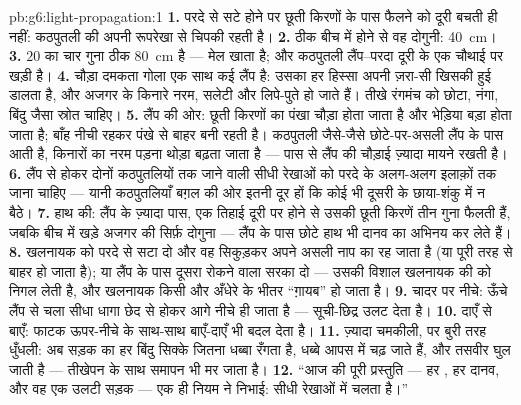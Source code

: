 \begin{solution}{pb:g6:light-propagation:1}
\textbf{1.} परदे से सटे होने पर छूती किरणों के पास फैलने को दूरी बचती
ही नहीं:  कठपुतली की अपनी रूपरेखा से चिपकी रहती है।
\textbf{2.} ठीक बीच में होने से वह दोगुनी: \qty{40}{cm}।
\textbf{3.} $20$ का चार गुना ठीक \qty{80}{cm} है --- मेल खाता है;
और कठपुतली लैंप--परदा दूरी के एक चौथाई पर खड़ी है।
\textbf{4.} चौड़ा दमकता गोला एक साथ कई लैंप है: उसका हर हिस्सा अपनी
ज़रा-सी खिसकी हुई  डालता है, और अजगर के किनारे नरम, सलेटी और
लिपे-पुते हो जाते हैं। तीखे रंगमंच को छोटा, नंगा, बिंदु जैसा स्रोत
चाहिए।
\textbf{5.} लैंप की ओर: छूती किरणों का पंखा चौड़ा होता जाता है और
भेड़िया बड़ा होता जाता है; बाँह नीची रहकर पंखे से बाहर बनी रहती है।
कठपुतली जैसे-जैसे छोटे-पर-असली लैंप के पास आती है, किनारों का नरम पड़ना
थोड़ा बढ़ता जाता है --- पास से लैंप की चौड़ाई ज़्यादा मायने रखती है।
\textbf{6.} लैंप से होकर दोनों कठपुतलियों तक जाने वाली सीधी रेखाओं को
परदे के अलग-अलग इलाक़ों तक जाना चाहिए --- यानी कठपुतलियाँ बग़ल की ओर
इतनी दूर हों कि कोई भी दूसरी के छाया-शंकु में न बैठे।
\textbf{7.} हाथ की: लैंप के ज़्यादा पास, एक तिहाई दूरी पर होने से
उसकी छूती किरणें तीन गुना फैलती हैं, जबकि बीच में खड़े अजगर की सिर्फ़
दोगुना --- लैंप के पास छोटे हाथ भी दानव का अभिनय कर लेते हैं।
\textbf{8.} खलनायक को परदे से सटा दो और वह सिकुड़कर अपने असली नाप का
रह जाता है (या पूरी तरह  से बाहर हो जाता है); या लैंप के पास
दूसरा रोकने वाला सरका दो --- उसकी विशाल  खलनायक की  को निगल
लेती है, और खलनायक किसी और अँधेरे के भीतर ``ग़ायब'' हो जाता है।
\textbf{9.} चादर पर नीचे: ऊँचे लैंप से चला सीधा धागा छेद से होकर आगे
नीचे ही जाता है --- सूची-छिद्र उलट देता है।
\textbf{10.} दाएँ से बाएँ: फाटक ऊपर-नीचे के साथ-साथ बाएँ-दाएँ भी बदल
देता है।
\textbf{11.} ज़्यादा चमकीली, पर बुरी तरह धुँधली: अब सड़क का हर बिंदु
सिक्के जितना धब्बा रँगता है, धब्बे आपस में चढ़ जाते हैं, और तसवीर घुल
जाती है --- तीखेपन के साथ समापन भी मर जाता है।
\textbf{12.} ``आज की पूरी प्रस्तुति --- हर , हर दानव, और वह एक
उलटी सड़क --- एक ही नियम ने निभाई:  सीधी रेखाओं में चलता है।''
\end{solution}

